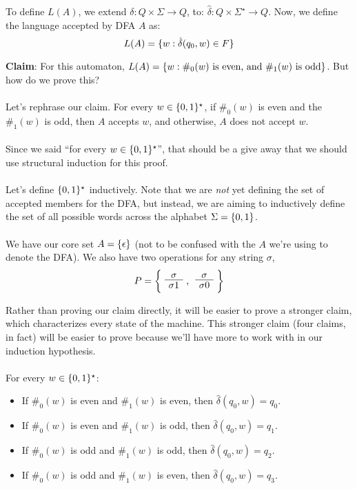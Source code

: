 \documentclass[]{article}
\DeclarePairedDelimiter{\set}{\lbrace}{\rbrace}
\theoremstyle{definition}
\begin{document}
      To define $L(A)$, we extend $\delta: Q \times \Sigma \to Q$, to: $\hat{\delta}: Q \times \Sigma^\star \to Q$. Now, we define the language accepted by DFA $A$ as:
      $$
        L(A) = \set{ w : \hat{\delta}(q_0, w) \in F }
      $$

      \textbf{Claim}: For this automaton, $L(A) = \set{ w : \#_0(w) \text{ is even, and } \#_1(w) \text{ is odd}}$. But how do we prove this?
      \\ \\
      Let's rephrase our claim. For every $w \in \set{0, 1}^\star$, if $\#_0(w)$ is even and the $\#_1(w)$ is odd, then $A$ accepts $w$, and otherwise, $A$ does not accept $w$.
      \\ \\
      Since we said ``for every $w \in \set{0, 1}^\star$'', that should be a give away that we should use structural induction for this proof.
      \\ \\
      Let's define $\set{0, 1}^\star$ inductively. Note that we are \emph{not} yet defining the set of accepted members for the DFA, but instead, we are aiming to inductively define the set of all possible words across the alphabet $\Sigma = \set{0, 1}$.
      \\ \\
      We have our core set $A = \set{ \epsilon }$ (not to be confused with the $A$ we're using to denote the DFA). We also have two operations for any string $\sigma$,
      $$
        P = \bigg\{ \text{\AxiomC{$\sigma$} \UnaryInfC{$\sigma 1$} \DisplayProof, \AxiomC{$\sigma$} \UnaryInfC{$\sigma 0$} \DisplayProof} \bigg\}
      $$

      Rather than proving our claim directly, it will be easier to prove a stronger claim, which characterizes every state of the machine. This stronger claim (four claims, in fact) will be easier to prove because we'll have more to work with in our induction hypothesis.
      \\ \\
      For every $w \in \set{0, 1}^\star$:

      \begin{itemize}
        \item If $\#_0(w)$ is even and $\#_1(w)$ is even, then $\hat{\delta}(q_0, w) = q_0$.
        \item If $\#_0(w)$ is even and $\#_1(w)$ is odd, then $\hat{\delta}(q_0, w) = q_1$.
        \item If $\#_0(w)$ is odd and $\#_1(w)$ is odd, then $\hat{\delta}(q_0, w) = q_2$.
        \item If $\#_0(w)$ is odd and $\#_1(w)$ is even, then $\hat{\delta}(q_0, w) = q_3$.
      \end{itemize}
\end{document}
